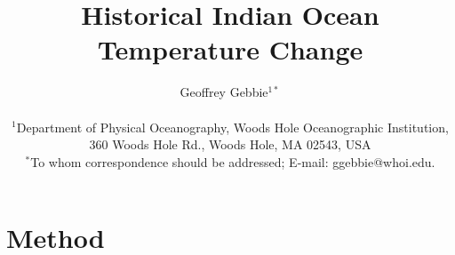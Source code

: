 \documentclass[12pt]{article}
\title{Historical Indian Ocean Temperature Change}
\author
{Geoffrey Gebbie$^{1\ast}$ \\
\\
\normalsize{$^{1}$Department of Physical Oceanography, Woods Hole Oceanographic Institution,}\\
\normalsize{360 Woods Hole Rd., Woods Hole, MA 02543, USA}\\ 
\normalsize{$^\ast$To whom correspondence should be addressed; E-mail:  ggebbie@whoi.edu.}
}
\date{}
\newenvironment{sciabstract}{%
\begin{quote} \bf}
{\end{quote}}
\begin{document}
 


\baselineskip24pt


\maketitle 


\begin{sciabstract}
\end{sciabstract}


\section{Method}

\end{document}
